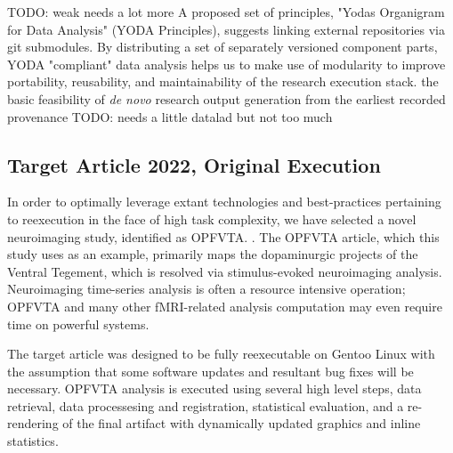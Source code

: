 TODO: weak needs a lot more
A proposed set of principles, "Yodas Organigram for Data Analysis" (YODA Principles), suggests linking external repositories via git submodules. \cite{TODO YODA}
By distributing a set of separately versioned component parts, YODA "compliant" data analysis helps us to make use of modularity to improve portability, reusability, and maintainability of the research execution stack.
the basic feasibility of \textit{de novo} research output generation from the earliest recorded provenance
TODO: needs a little datalad but not too much


\subsection{Target Article 2022, Original Execution}

In order to optimally leverage extant technologies and best-practices pertaining to reexecution in the face of high task complexity, we have selected a novel neuroimaging study, identified as OPFVTA. \cite{opfvta}.
The OPFVTA article, which this study uses as an example, primarily maps the dopaminurgic projects of the Ventral Tegement, which is resolved via stimulus-evoked neuroimaging analysis.
Neuroimaging time-series analysis is often a resource intensive operation; OPFVTA and many other fMRI-related analysis computation may even require time on powerful systems.

The target article was designed to be fully reexecutable on Gentoo Linux with the assumption that some software updates and resultant bug fixes will be necessary.
OPFVTA analysis is executed using several high level steps, data retrieval, data processesing and registration, statistical evaluation, and a re-rendering of the final artifact with dynamically updated graphics and inline statistics.


